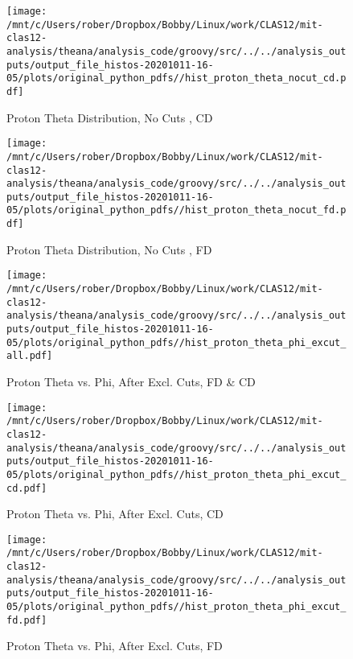 \documentclass{article}
\begin{document}
\begin{landscape}
    \begin{figure}[h]
        \centering

        \texttt{[image: /mnt/c/Users/rober/Dropbox/Bobby/Linux/work/CLAS12/mit-clas12-analysis/theana/analysis\_code/groovy/src/../../analysis\_outputs/output\_file\_histos-20201011-16-05/plots/original\_python\_pdfs//hist\_proton\_theta\_nocut\_cd.pdf]}
        \captionsetup{textformat=empty,labelformat=blank}
        \caption{Proton Theta Distribution, No Cuts , CD}
    \end{figure}
    \clearpage
    
    \begin{figure}[h]
        \centering

        \texttt{[image: /mnt/c/Users/rober/Dropbox/Bobby/Linux/work/CLAS12/mit-clas12-analysis/theana/analysis\_code/groovy/src/../../analysis\_outputs/output\_file\_histos-20201011-16-05/plots/original\_python\_pdfs//hist\_proton\_theta\_nocut\_fd.pdf]}
        \captionsetup{textformat=empty,labelformat=blank}
        \caption{Proton Theta Distribution, No Cuts , FD}
    \end{figure}
    \clearpage
    
    \begin{figure}[h]
        \centering

        \texttt{[image: /mnt/c/Users/rober/Dropbox/Bobby/Linux/work/CLAS12/mit-clas12-analysis/theana/analysis\_code/groovy/src/../../analysis\_outputs/output\_file\_histos-20201011-16-05/plots/original\_python\_pdfs//hist\_proton\_theta\_phi\_excut\_all.pdf]}
        \captionsetup{textformat=empty,labelformat=blank}
        \caption{Proton Theta vs. Phi, After Excl. Cuts, FD \& CD}
    \end{figure}
    \clearpage
    
    \begin{figure}[h]
        \centering

        \texttt{[image: /mnt/c/Users/rober/Dropbox/Bobby/Linux/work/CLAS12/mit-clas12-analysis/theana/analysis\_code/groovy/src/../../analysis\_outputs/output\_file\_histos-20201011-16-05/plots/original\_python\_pdfs//hist\_proton\_theta\_phi\_excut\_cd.pdf]}
        \captionsetup{textformat=empty,labelformat=blank}
        \caption{Proton Theta vs. Phi, After Excl. Cuts, CD}
    \end{figure}
    \clearpage
    
    \begin{figure}[h]
        \centering

        \texttt{[image: /mnt/c/Users/rober/Dropbox/Bobby/Linux/work/CLAS12/mit-clas12-analysis/theana/analysis\_code/groovy/src/../../analysis\_outputs/output\_file\_histos-20201011-16-05/plots/original\_python\_pdfs//hist\_proton\_theta\_phi\_excut\_fd.pdf]}
        \captionsetup{textformat=empty,labelformat=blank}
        \caption{Proton Theta vs. Phi, After Excl. Cuts, FD}
    \end{figure}
    \clearpage
    

\end{landscape}
\end{document}
